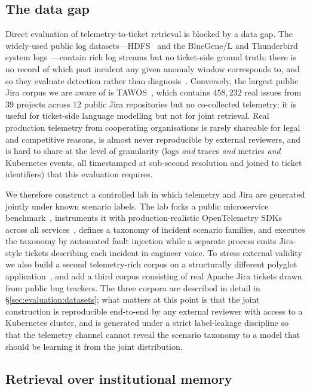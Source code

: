 \subsection{The data gap}
\label{sec:background:datagap}

Direct evaluation of telemetry-to-ticket retrieval is blocked by a data gap. The widely-used public log datasets---HDFS~\cite{xu2009hdfs} and the BlueGene/L and Thunderbird system logs~\cite{oliner2007supercomputers}---contain rich log streams but no ticket-side ground truth: there is no record of which past incident any given anomaly window corresponds to, and so they evaluate detection rather than diagnosis~\cite{loganalysis-survey}. Conversely, the largest public Jira corpus we are aware of is TAWOS~\cite{tawos}, which contains $458{,}232$ real issues from $39$ projects across $12$ public Jira repositories but no co-collected telemetry: it is useful for ticket-side language modelling but not for joint retrieval. Real production telemetry from cooperating organisations is rarely shareable for legal and competitive reasons, is almost never reproducible by external reviewers, and is hard to share at the level of granularity (logs \emph{and} traces \emph{and} metrics \emph{and} Kubernetes events, all timestamped at sub-second resolution and joined to ticket identifiers) that this evaluation requires.

We therefore construct a controlled lab in which telemetry and Jira are generated jointly under known scenario labels. The lab forks a public microservice benchmark~\cite{onlineboutique}, instruments it with production-realistic OpenTelemetry SDKs across all services~\cite{otel-spec}, defines a taxonomy of incident scenario families, and executes the taxonomy by automated fault injection while a separate process emits Jira-style tickets describing each incident in engineer voice. To stress external validity we also build a second telemetry-rich corpus on a structurally different polyglot application~\cite{otel-demo}, and add a third corpus consisting of real Apache Jira tickets drawn from public bug trackers. The three corpora are described in detail in \S\ref{sec:evaluation:datasets}; what matters at this point is that the joint construction is reproducible end-to-end by any external reviewer with access to a Kubernetes cluster, and is generated under a strict label-leakage discipline so that the telemetry channel cannot reveal the scenario taxonomy to a model that should be learning it from the joint distribution.

\subsection{Retrieval over institutional memory}
\label{sec:background:retrieval}

